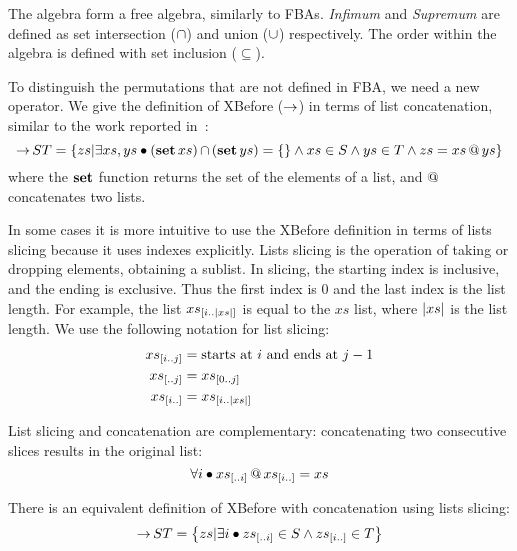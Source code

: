 \documentclass[en,twoside,onehalfspacing,phd]{risethesis}
\makeatletter
\newcommand{\sliceright}[2]{\ensuremath #1_{\left[..#2\right]}}
\newcommand{\sliceleft}[2]{\ensuremath #1_{\left[#2..\right]}}
\newcommand{\slice}[3]{\ensuremath #1_{\left[#2..#3\right]}}
\def\xbeforeop{\ensuremath\rightarrow}
\newcommand{\xbefore}[2]{\ensuremath #1 \xbeforeop #2 }
\newcommand{\length}[1]{\ensuremath\left|#1\right|}
\newcommand{\append}[2]{\ensuremath #1 \operatorname{\mathbf{@}} #2}
\def\listsetop{\ensuremath\operatorname{\mathbf{set}}}
\newcommand{\listset}[1]{\ensuremath\listsetop #1}
\newcommand{\setsin}[1]{\ensuremath\left\{ #1 \right\}}
\newcommand{\parsin}[1]{\ensuremath\left( #1 \right)}
\def\union{\ensuremath\operatorname{\cup}}
\def\inter{\ensuremath\operatorname{\cap}}
\def\xbefore{\ensuremath\operatorname{\rightarrow}}
\makeatother
\begin{document}
The \ac{algebra} form a free algebra, similarly to \acp{FBA}.
\emph{Infimum} and \emph{Supremum} are defined as set intersection ($\inter$) and union ($\union$) respectively.
The order within the algebra is defined with set inclusion ($\subseteq$).

To distinguish the permutations that are not defined in \ac{FBA}, we need a new operator.
We give the definition of XBefore ($\xbeforeop$) in terms of list concatenation, similar to the work reported in~\cite{DM2015}:
%
\begin{equation}
\label{def:xbefore-append}
\xbefore{S}{T} =
  \setsin{
    zs | \exists xs, ys \bullet \parsin{\listset{xs}} \inter \parsin{\listset{ys}} = \{\}
      \land xs \in S \land ys \in T \land zs = \append{xs}{ys}
  }
\end{equation}
%
where the $\listset{}$ function returns the set of the elements of a list, and $\append{}{}$ concatenates two lists.

In some cases it is more intuitive to use the XBefore definition in terms of lists slicing because it uses indexes explicitly.
Lists slicing is the operation of taking or dropping elements, obtaining a sublist.
In slicing, the starting index is inclusive, and the ending is exclusive.
Thus the first index is 0 and the last index is the list length.
For example, the list $\slice{xs}{i}{\length{xs}}$ is equal to the $xs$ list, where $\length{xs}$ is the list length.
We use the following notation for list slicing:
%
\begin{subequations}
\begin{align}
\slice{xs}{i}{j} &= \text{starts at $i$ and ends at $j-1$}\\
\sliceright{xs}{j} &= \slice{xs}{0}{j}\\
\sliceleft{xs}{i} &= \slice{xs}{i}{\length{xs}}
\end{align}
\end{subequations}

List slicing and concatenation are complementary: concatenating two consecutive slices results in the original list:
\begin{equation}
\forall i \bullet \append{\sliceright{xs}{i}}{\sliceleft{xs}{i}} = xs
\end{equation}

There is an equivalent definition of XBefore with concatenation using lists slicing:
%
\begin{equation}
\xbefore{S}{T} =
  \setsin{
    zs | \exists i \bullet \sliceright{zs}{i} \in S \land \sliceleft{zs}{i} \in T
  }
\end{equation}
\end{document}
